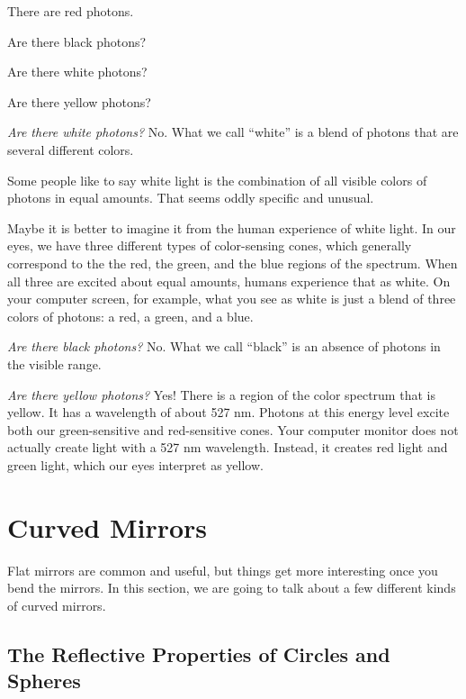\begin{Exercise}[title={Photons and Color}, label=photon_color]

  There are red photons.

  Are there black photons?

  Are there white photons?

  Are there yellow photons?
  
\end{Exercise}
\begin{Answer}
  
\textit{Are there white photons?}  No. What we call ``white'' is a
blend of photons that are several different colors.

Some people like to say white light is the combination of all visible
colors of photons in equal amounts. That seems oddly specific and unusual.

Maybe it is better to imagine it from the human experience of white
light. In our eyes, we have three different types of color-sensing
cones, which generally correspond to the the red, the green, and the
blue regions of the spectrum.  When all three are excited about equal
amounts, humans experience that as white.  On your computer screen,
for example, what you see as white is just a blend of three colors of
photons: a red, a green, and a blue.

\textit{Are there black photons?}  No. What we call ``black'' is an
absence of photons in the visible range.

\textit{Are there yellow photons?} Yes! There is a region of the color
spectrum that is yellow. It has a wavelength of about 527 nm.  Photons
at this energy level excite both our green-sensitive and red-sensitive
cones.
Your computer monitor does not actually create light with a 527 nm
wavelength. Instead, it creates red light and green light, which our
eyes interpret as yellow.

\end{Answer}

\section{Curved Mirrors}

Flat mirrors are common and useful, but things get more interesting
once you bend the mirrors. In this section, we are going to talk about
a few different kinds of curved mirrors.

\subsection{The Reflective Properties of Circles and Spheres}

